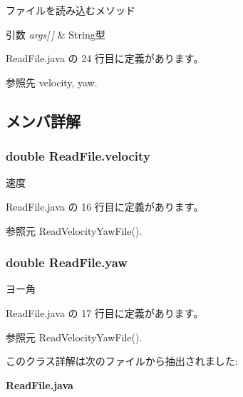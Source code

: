 ファイルを読み込むメソッド 


\begin{DoxyParams}{引数}
{\em args\mbox{[}$\,$\mbox{]}} & String型 \\
\hline
\end{DoxyParams}


 Read\-File.\-java の 24 行目に定義があります。



参照先 velocity, yaw.



\subsection{メンバ詳解}
\subsubsection[{velocity}]{\setlength{\rightskip}{0pt plus 5cm}double Read\-File.\-velocity}\label{class_read_file_a9389e007e9ee86d18f29e5117f5d5d63}


速度 



 Read\-File.\-java の 16 行目に定義があります。



参照元 Read\-Velocity\-Yaw\-File().

\subsubsection[{yaw}]{\setlength{\rightskip}{0pt plus 5cm}double Read\-File.\-yaw}\label{class_read_file_afb5e582fdf100eba04ef789b0803dcb7}


ヨー角 



 Read\-File.\-java の 17 行目に定義があります。



参照元 Read\-Velocity\-Yaw\-File().



このクラス詳解は次のファイルから抽出されました\-:\begin{DoxyCompactItemize}
\item 
{\bf Read\-File.\-java}\end{DoxyCompactItemize}
